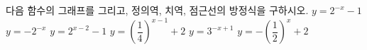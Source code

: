 다음 함수의 그래프를 그리고, 정의역, 치역, 점근선의 방정식을 구하시오.
 $y=2^{-x}-1$
 $y=-2^{-x}$
 $y=2^{x-2}-1$
 $y=\left(\dfrac{1}{4}\right)^{x-1}+2$
 $y=3^{-x+1}$
 $y=-\left(\dfrac{1}{2}\right)^{x}+2$
